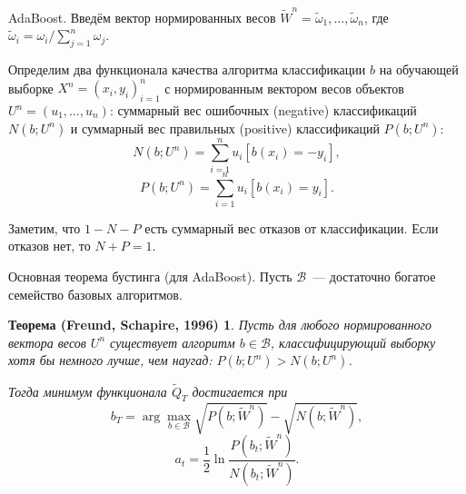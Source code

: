 \documentclass[10pt,unicode,notheorems]{beamer}
\newtheorem{theorem+}{Теорема (Freund, Schapire, 1996)}
\begin{document}
\begin{frame}{AdaBoost.}
Введём вектор нормированных весов $\widetilde W^n = \widetilde{\omega}_1, \ldots, \widetilde{\omega}_n$, где $\widetilde{\omega}_i = \omega_i / \sum_{j=1}^{n} \omega_j$.
\vspace{0.2cm}

Определим два функционала качества алгоритма классификации $b$ на обучающей выборке  $X^n = (x_i,y_i)_{i=1}^n$ с нормированным вектором весов объектов $U^n = (u_1, \ldots , u_n)$: суммарный вес ошибочных (negative) классификаций $N(b; U^n)$ и суммарный вес правильных (positive) классификаций $P(b; U^n)$:
$$N(b; U^n) = \sum_{i=1}^{n} u_i [b(x_i)=-y_i],$$
$$P(b; U^n) = \sum_{i=1}^{n} u_i [b(x_i)=y_i].$$

Заметим, что $1 - N - P$ есть суммарный вес отказов от классификации. Если
отказов нет, то $N + P = 1$.   
\end{frame}


\begin{frame}{Основная теорема бустинга (для AdaBoost).}
Пусть $\mathcal{B}$~--- достаточно богатое семейство базовых алгоритмов.

\begin{theorem+}
Пусть для любого нормированного вектора весов $U^n$ существует алгоритм $b \in \mathcal{B}$, классифицирующий выборку хотя бы немного лучше, чем наугад: $P(b; U^n)>N(b; U^n)$.


Тогда минимум функционала $\widetilde {Q}_T$ достигается при
$$b_T = \arg \max \limits_{b \in \mathcal{B}} \sqrt{P(b; \widetilde{W}^n)}-\sqrt{N(b; \widetilde {W}^n)},$$
$$a_t = \frac{1}{2} \ln \frac{P(b_t; \widetilde{W}^n)}{N(b_t; \widetilde{W}^n)}.$$
\end{theorem+}
    
\end{frame}
\end{document}
